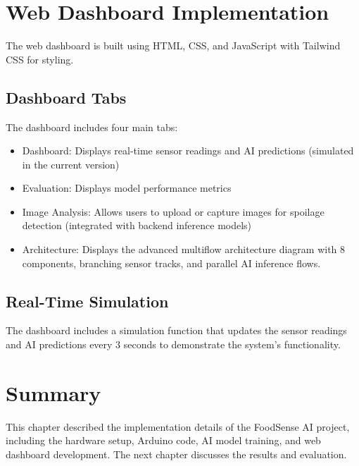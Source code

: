 \section{Web Dashboard Implementation}
The web dashboard is built using HTML, CSS, and JavaScript with Tailwind CSS for styling.

\subsection{Dashboard Tabs}
The dashboard includes four main tabs:
\begin{itemize}
    \item Dashboard: Displays real-time sensor readings and AI predictions (simulated in the current version)
    \item Evaluation: Displays model performance metrics
    \item Image Analysis: Allows users to upload or capture images for spoilage detection (integrated with backend inference models)
    \item Architecture: Displays the advanced multiflow architecture diagram with 8 components, branching sensor tracks, and parallel AI inference flows.
\end{itemize}

\subsection{Real-Time Simulation}
The dashboard includes a simulation function that updates the sensor readings and AI predictions every 3 seconds to demonstrate the system's functionality.

\section{Summary}
This chapter described the implementation details of the FoodSense AI project, including the hardware setup, Arduino code, AI model training, and web dashboard development. The next chapter discusses the results and evaluation.
